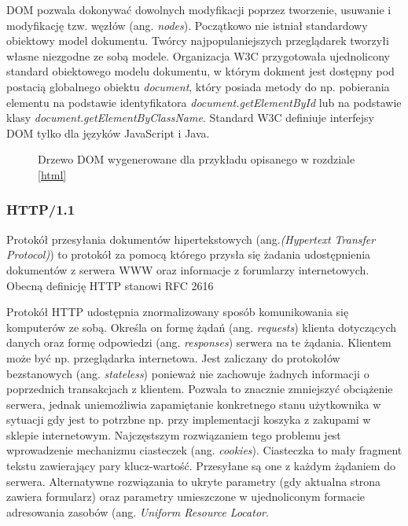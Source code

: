 \documentclass[polish, twoside, 12pt]{mwart}
\begin{document}
DOM pozwala dokonywać dowolnych modyfikacji poprzez tworzenie, usuwanie i modyfikację tzw. węzłów (ang. \emph{nodes}). Początkowo nie istniał standardowy obiektowy model dokumentu. Twórcy najpopulaniejszych przeglądarek tworzyłi własne niezgodne ze sobą modele. Organizacja W3C \cite{w3c} przygotowała ujednolicony standard obiektowego modelu dokumentu, w którym dokment jest dostępny pod postacią globalnego obiektu \emph{document}, który posiada metody do np. pobierania elementu na podstawie identyfikatora \emph{document.getElementById} lub na podstawie klasy \emph{document.getElementByClassName}. Standard W3C definiuje interfejsy DOM tylko dla języków JavaScript i Java.

\begin{figure}
  \centering
  \caption{Drzewo DOM wygenerowane dla przykładu opisanego w rozdziale \ref{html}}
\end{figure}

\subsubsection{HTTP/1.1}

Protokół przesyłania dokumentów hipertekstowych (ang.\emph{(Hypertext Transfer Protocol)}) to protokół za pomocą którego przysła się żadania udostępnienia dokumentów z serwera WWW oraz informacje z forumlarzy internetowych. Obecną definicję HTTP stanowi RFC 2616 \cite{rfc2616}

Protokół HTTP udostępnia znormalizowany sposób komunikowania się komputerów ze sobą. Określa on formę żądań (ang. \emph{requests}) klienta dotyczących danych oraz formę odpowiedzi (ang. \emph{responses}) serwera na te żądania. Klientem może być np. przeglądarka internetowa. Jest zaliczany do protokołów bezstanowych (ang. \emph{stateless}) ponieważ nie zachowuje żadnych informacji o poprzednich transakcjach z klientem. Pozwala to znacznie zmniejszyć obciążenie serwera, jednak uniemożliwia zapamiętanie konkretnego stanu użytkownika w sytuacji gdy jest to potrzbne np. przy implementacji koszyka z zakupami w sklepie internetowym. Najczęstszym rozwiązaniem tego problemu jest wprowadzenie mechanizmu ciasteczek (ang. \emph{cookies}). Ciasteczka to mały fragment tekstu zawierający pary klucz-wartość. Przesyłane są one z każdym żądaniem do serwera. Alternatywne rozwiązania to ukryte parametry (gdy aktualna strona zawiera formularz) oraz parametry umieszczone w ujednoliconym formacie adresowania zasobów (ang. \emph{Uniform Resource Locator}.
\end{document}
